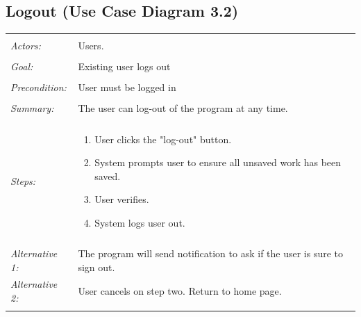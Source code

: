 \documentclass[11pt]{report}
\begin{document}
\subsection{Logout (Use Case Diagram 3.2)}
\begin{tabular}{ p{2cm} p{12cm} }
 \hline
 \\
 \textit{Actors:} & Users. \\ 
  \\
 \textit{Goal:} & Existing user logs out \\ 
 \\
 \textit{Precondition:} & User must be logged in \\
 \\
 \textit{Summary:}  & The user can log-out of the program at any time. \\
 \\
 \textit{Steps:} & \begin{enumerate}
 \item User clicks the "log-out" button. 
 \item System prompts user to ensure all unsaved work has been saved. 
 \item User verifies. 
 \item System logs user out. 
 \end{enumerate} \\
\\
  \textit{Alternative 1:} & The program will send notification to ask if the user is sure to sign out. \\
  \textit{Alternative 2:} & User cancels on step two. Return to home page. \\ 
 \\
\hline
\end{tabular}
\end{document}
